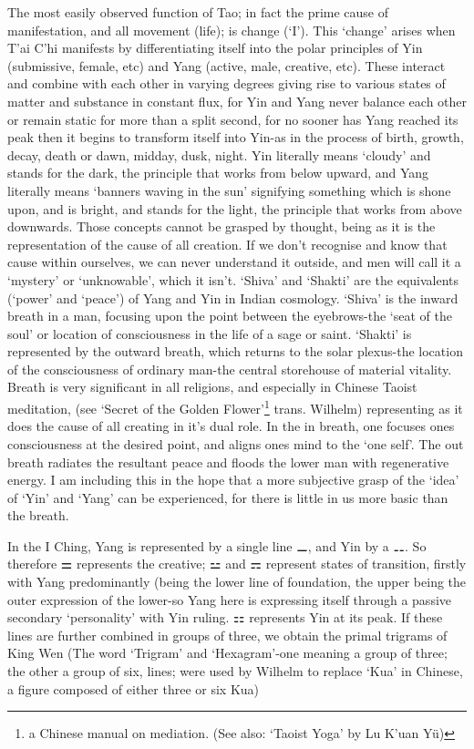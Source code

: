 \documentclass[11pt]{book}
\begin{document}
The most easily observed function of Tao; in fact the prime cause of manifestation, and all movement (life); is change (`I'). This `change' arises when T'ai C'hi manifests by differentiating itself into the polar principles of Yin (submissive, female, etc) and Yang (active, male, creative, etc). These interact and combine with each other in varying degrees giving rise to various states of matter and substance in constant flux, for Yin and Yang never balance each other or remain static for more than a split second, for no sooner has Yang reached its peak then it begins to transform itself into Yin-as in the process of birth, growth, decay, death or dawn, midday, dusk, night. Yin literally means `cloudy' and stands for the dark, the principle that works from below upward, and Yang literally means `banners waving in the sun' signifying something which is shone upon, and is bright, and stands for the light, the principle that works from above downwards. Those concepts cannot be grasped by thought, being as it is the representation of the cause of all creation. If we don't recognise and know that cause within ourselves, we can never understand it outside, and men will call it a `mystery' or `unknowable', which it isn't. `Shiva' and `Shakti' are the equivalents (`power' and `peace') of Yang and Yin in Indian cosmology. `Shiva' is the inward breath in a man, focusing upon the point between the eyebrows-the `seat of the soul' or location of consciousness in the life of a sage or saint. `Shakti' is represented by the outward breath, which returns to the solar plexus-the location of the consciousness of ordinary man-the central storehouse of material vitality. Breath is very significant in all religions, and especially in Chinese Taoist meditation, (see `Secret of the Golden Flower'\footnote{a Chinese manual on mediation. (See also: `Taoist Yoga' by Lu K'uan Yü)} trans. Wilhelm) representing as it does the cause of all creating in it's dual role. In the in breath, one focuses ones consciousness at the desired point, and aligns ones mind to the `one self'. The out breath radiates the resultant peace and floods the lower man with regenerative energy. I am including this in the hope that a more subjective grasp of the `idea' of `Yin' and `Yang' can be experienced, for there is little in us more basic than the breath.

In the I Ching, Yang is represented by a single line ⚊, and Yin by a ⚋. So therefore ⚌ represents the creative; ⚍ and ⚎ represent states of transition, firstly with Yang predominantly (being the lower line of foundation, the upper being the outer expression of the lower-so Yang here is expressing itself through a passive secondary `personality' with Yin ruling. ⚏ represents Yin at its peak. If these lines are further combined in groups of three, we obtain the primal trigrams of King Wen (The word `Trigram' and `Hexagram'-one meaning a group of three; the other a group of six, lines; were used by Wilhelm to replace `Kua' in Chinese, a figure composed of either three or six Kua)
\end{document}
